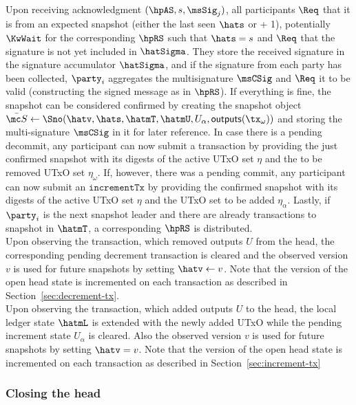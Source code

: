 \quad Upon receiving acknowledgment $(\hpAS,s,\msSig_j)$, all
participants $\Req$ that it is from an expected snapshot (either the last seen
$\hats$ or + 1), potentially $\KwWait$ for the corresponding $\hpRS$ such that
$\hats = s$ and $\Req$ that the signature is not yet included in $\hatSigma$.
They store the received signature in the signature accumulator $\hatSigma$, and
if the signature from each party has been collected, $\party_i$ aggregates the
multisignature $\msCSig$ and $\Req$ it to be valid (constructing the signed
message as in $\hpRS$). If everything is fine, the snapshot can be considered
confirmed by creating the snapshot object
$\bar{\mc S} \gets \Sno(\hatv, \hats, \hatmT, \hatmU, U_{\alpha}, \mathsf{outputs}(\tx_{\omega}))$
and storing the multi-signature $\msCSig$ in it for later reference. In case
there is a pending decommit, any participant can now submit a \mtxDecrement{}
transaction by providing the just confirmed snapshot with its digests of the
active UTxO set $\eta$ and the to be removed UTxO set $\eta_{\omega}$. If, however, there
was a pending commit, any participant can now submit an $\mathtt{incrementTx}$
by providing the confirmed snapshot with its digests of the active UTxO set $\eta$
and the UTxO set to be added $\eta_\alpha$. Lastly, if $\party_i$ is the next snapshot
leader and there are already transactions to snapshot in $\hatmT$, a
corresponding $\hpRS$ is distributed. \\

\quad Upon observing the \mtxDecrement{}
transaction, which removed outputs $U$ from the head, the corresponding pending
decrement transaction is cleared and the observed version $v$ is used for future
snapshots by setting $\hatv \gets v$. Note that the version of the open head state
is incremented on each \mtxDecrement{} transaction as described in
Section~\ref{sec:decrement-tx}. \\

\quad Upon observing the \mtxIncrement{}
  transaction, which added outputs $U$ to the head, the local ledger state
  $\hatmL$ is extended with the newly added UTxO while the pending increment
  state $U_{\alpha}$ is cleared. Also the observed version $v$ is used for future
  snapshots by setting $\hatv = v$. Note that the version of the open head state
  is incremented on each \mtxIncrement{} transaction as described in
  Section~\ref{sec:increment-tx}

\subsubsection{Closing the head}

